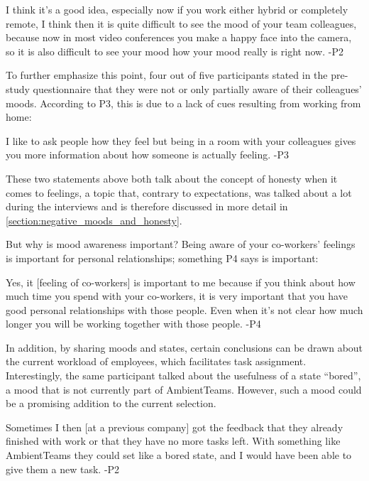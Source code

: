 \begin{displayquote}
    I think it's a good idea, especially now if you work either hybrid or completely remote, I think then it is quite difficult to see the mood of your team colleagues, because now in most video conferences you make a happy face into the camera, so it is also difficult to see your mood how your mood really is right now. -P2
\end{displayquote}

To further emphasize this point, four out of five participants stated in the pre-study questionnaire that they were not or only partially aware of their colleagues' moods. According to P3, this is due to a lack of cues resulting from working from home:

\begin{displayquote}
    I like to ask people how they feel but being in a room with your colleagues gives you more information about how someone is actually feeling. -P3
\end{displayquote}

These two statements above both talk about the concept of honesty when it comes to feelings, a topic that, contrary to expectations, was talked about a lot during the interviews and is therefore discussed in more detail in \autoref{section:negative_moods_and_honesty}.

But why is mood awareness important? Being aware of your co-workers' feelings is important for personal relationships; something P4 says is important:

\begin{displayquote}
    Yes, it [feeling of co-workers] is important to me because if you think about how much time you spend with your co-workers, it is very important that you have good personal relationships with those people. Even when it's not clear how much longer you will be working together with those people. -P4
\end{displayquote}

In addition, by sharing moods and states, certain conclusions can be drawn about the current workload of employees, which facilitates task assignment. Interestingly, the same participant talked about the usefulness of a state \enquote{bored}, a mood that is not currently part of AmbientTeams. However, such a mood could be a promising addition to the current selection.

\begin{displayquote}
    Sometimes I then [at a previous company] got the feedback that they already finished with work or that they have no more tasks left. With something like AmbientTeams they could set like a bored state, and I would have been able to give them a new task. -P2
\end{displayquote}

